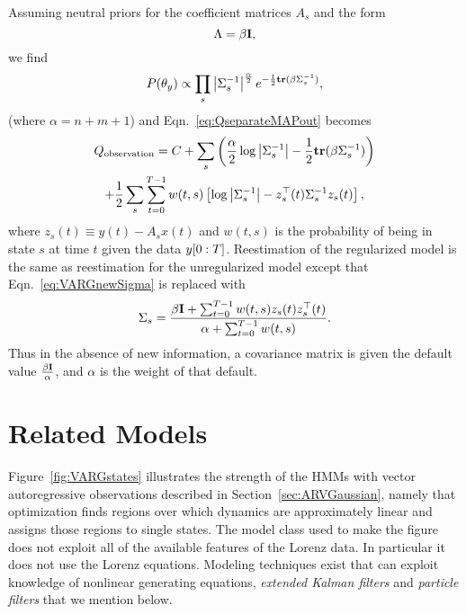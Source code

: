 Assuming neutral priors for the coefficient matrices $A_s$ and the
form
\begin{equation*}
  \Lambda = \beta {\bf I},
\end{equation*}
we find
\begin{equation*}
  P(\theta_y) \propto \prod_s \left| \Sigma_s^{-1}
                    \right|^{\frac{\alpha}{2}}
                    e^{-\frac{1}{2} {\bf tr}(\beta \Sigma_s^{-1})},
\end{equation*}
(where $\alpha = n+m+1$) and Eqn.~\ref{eq:QseparateMAPout} becomes
\begin{multline*}
  \label{eq:QVARG1}
  Q_{\text{observation}} = C + \sum_s \left( \frac{\alpha}{2}\log\left|
      \Sigma_s^{-1}\right| - \frac{1}{2} {\bf tr}(\beta
    \Sigma_s^{-1}) \right) \\
  + \frac{1}{2} \sum_s \sum_{t=0}^{T-1} w(t,s) \left[ \log \left|
      \Sigma_s^{-1} \right| - z_s^\top(t) \Sigma_s^{-1} z_s(t)\right],
\end{multline*}
where $z_s(t) \equiv y(t) - A_s x(t)$ and $w(t,s)$ is the probability
of being in state $s$ at time $t$ given the data $y[0:T]$.
Reestimation of the regularized model is the same as reestimation for
the unregularized model except that Eqn.~\ref{eq:VARGnewSigma} is
replaced with
\begin{equation}\label{eq:NewSigma}
  \Sigma_s = \frac{\beta {\bf I} + \sum_{t=0}^{T-1} w(t,s) z_s(t)
    z_s^\top(t)} {\alpha + \sum_{t=0}^{T-1} w(t,s)}.
\end{equation}
Thus in the absence of new information, a covariance matrix is given
the default value $\frac{\beta {\bf I}}{\alpha}$, and $\alpha$ is the
weight of that default.

\section{Related Models}
\label{sec:related}

Figure~\ref{fig:VARGstates} illustrates the strength  of the
HMMs with vector autoregressive observations described in
Section~\ref{sec:ARVGaussian}, namely that optimization finds regions
over which dynamics are approximately linear and assigns those regions
to single states.  The model class used to make the figure does not
exploit all of the available features of the Lorenz data.  In
particular it does not use the Lorenz equations.  Modeling techniques
exist that can exploit knowledge of nonlinear generating equations,
\eg \emph{extended Kalman filters} and \emph{particle filters} that we
mention below.

